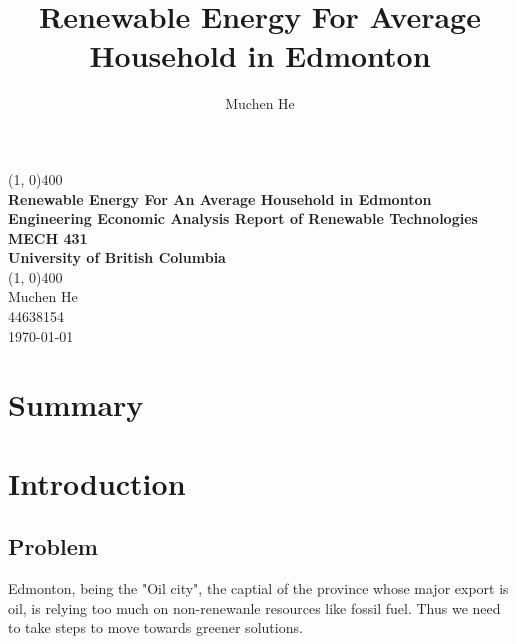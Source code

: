 \documentclass[10pt,letterpaper]{article}
\author{Muchen He}
\title{Renewable Energy For Average Household in Edmonton}
\begin{document}
\begin{titlepage}
	\begin{center}
		\vspace*{3in}
		\line(1, 0){400}\\
		\Huge{\textbf{Renewable Energy For An Average Household in Edmonton}}\\[0.2cm]
		\large{\textbf{Engineering Economic Analysis Report of Renewable Technologies}}\\[1cm]
		\Large{\textbf{MECH 431}}\\
		\textbf{University of British Columbia}\\
		\line(1, 0){400}\\
		\vfill
		\Large{Muchen He}\\
		44638154\\

		\today\\
	\end{center}
\end{titlepage}

\section*{Summary}
\clearpage

\setcounter{secnumdepth}{3}
\tableofcontents
\thispagestyle{empty}
\clearpage

\thispagestyle{empty}
\listoffigures
\listoftables
\newpage

\setcounter{page}{1}

\section{Introduction}\label{section:introduction}

\subsection{Problem}

Edmonton, being the "Oil city", the captial of the province whose major export is oil, is relying too much on non-renewanle resources like fossil fuel. Thus we need to take steps to move towards greener solutions.\\
\end{document}
